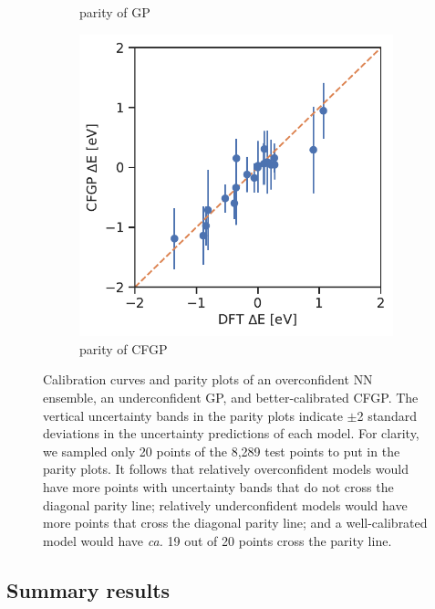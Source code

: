 \documentclass[]{achemso}
\begin{document}
\begin{figure}
\begin{subfigure}[b]{0.32\textwidth}
        \caption{parity of \gls{GP}}\label{fig:error_bar_gp}
    \end{subfigure}
    \begin{subfigure}[b]{0.32\textwidth}
        \includegraphics[width=\textwidth]{../CFGP/Matern/error_bar_parity.pdf}
        \caption{parity of \gls{CFGP}}\label{fig:error_bar_cfgp}
    \end{subfigure}
    \caption{Calibration curves and parity plots of an overconfident \gls{NN} ensemble, an underconfident \gls{GP}, and better-calibrated \gls{CFGP}.
    The vertical uncertainty bands in the parity plots indicate $\pm$2 standard deviations in the uncertainty predictions of each model.
    For clarity, we sampled only 20 points of the 8,289 test points to put in the parity plots.
    It follows that relatively overconfident models would have more points with uncertainty bands that do not cross the diagonal parity line;
    relatively underconfident models would have more points that cross the diagonal parity line;
    and a well-calibrated model would have \textit{ca.} 19 out of 20 points cross the parity line.}\label{fig:error_bars}
\end{figure}

\subsection{Summary results}
\end{document}
